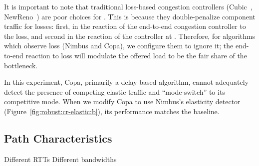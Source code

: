 It is important to note that traditional loss-based congestion controllers (\ie Cubic~\cite{cubic}, NewReno~\cite{newreno}) are poor choices for \name. 
This is because they double-penalize component traffic for losses: first, in the reaction of the end-to-end congestion controller to the loss, and second in the reaction of the controller at \name.
Therefore, for algorithms which observe loss (Nimbus and Copa), we configure them to ignore it; the end-to-end reaction to loss will modulate the offered load to be the fair share of the bottleneck.

In this experiment, Copa, primarily a delay-based algorithm, cannot adequately detect the presence of competing elastic traffic and ``mode-switch'' to its competitive mode. When we modify Copa to use Nimbus's elasticity detector (Figure~\ref{fig:robust:cr-elastic:b}), its performance matches the baseline.

 

\subsection{Path Characteristics}\label{s:robust:path}
\begin{outline}
\1 Different RTTs
\1 Different bandwidths
\end{outline}
